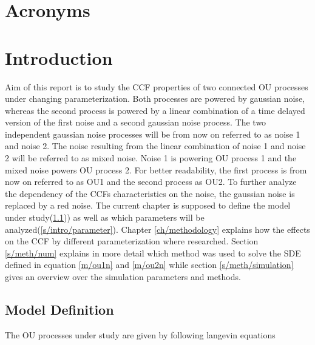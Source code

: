 \documentclass[a4paper,12pt]{book}
\makeatletter
\def\cleardoublepage{\clearpage\if@twoside \ifodd\c@page\else%
  \hbox{}%
  \thispagestyle{empty}%
  \newpage%
  \if@twocolumn\hbox{}\newpage\fi\fi\fi}
\theoremstyle{break}
\makeatother
\begin{document}
\clearpage
\chapter*{Acronyms}
\begin{acronym}[CP-OFDMX] %
\end{acronym}


\mainmatter
\pagestyle{fancy}

\cleardoublepage
\chapter{Introduction}\label{ch/intro}
Aim of this report is to study the \ac{CCF} properties of two connected \ac{OU} processes under changing parameterization.
Both processes are powered by gaussian noise, whereas the second process is powered by a linear combination of a time delayed version of the first noise and a second gaussian noise process. The two independent gaussian noise processes will be from now on referred to as noise 1 and noise 2. The noise resulting from the linear combination of noise 1 and noise 2 will be referred to as mixed noise. Noise 1 is powering \ac{OU} process 1 and the mixed noise powers \ac{OU} process 2. For better readability, the first process is from now on referred to as OU1 and the second process as OU2.
To further analyze the dependency of the \ac{CCF}s characteristics on the noise, the gaussian noise is replaced by a red noise.
The current chapter is supposed to define the model under study(\ref{s/model})) as well as which parameters will be analyzed(\ref{s/intro/parameter}).
Chapter \ref{ch/methodology} explains how the effects on the \ac{CCF} by different parameterization where researched. Section \ref{s/meth/num} explains in more detail which method was used to solve the \ac{SDE} defined in equation \ref{m/ou1n} and \ref{m/ou2n} while section \ref{s/meth/simulation} gives an overview over the simulation parameters and methods.

\section{Model Definition}\label{s/model}
The \ac{OU} processes under study are given by following langevin equations
\end{document}
